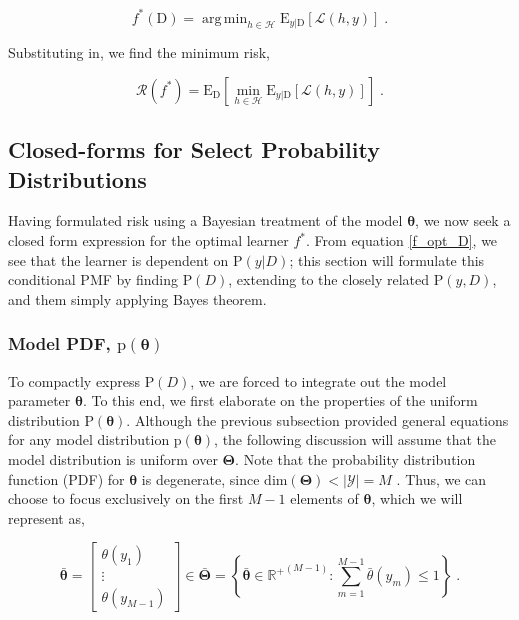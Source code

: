 \documentclass[12pt]{report}
\DeclareMathOperator*{\argmin}{arg\,min}
\begin{document}
\begin{equation} \label{f_opt_D}
f^*(\mathrm{D}) = \argmin_{h \in \mathcal{H}} \text{E}_{y|\mathrm{D}}\left[ \mathcal{L}(h,y) \right] \;.
\end{equation}

Substituting in, we find the minimum risk,

\begin{equation} \label{risk_min}
\mathcal{R}(f^*) = \text{E}_{\mathrm{D}} \left[ \min_{h \in \mathcal{H}} \text{E}_{y|\mathrm{D}}\left[ \mathcal{L}(h,y) \right] \right] \;.
\end{equation}




\subsection{Closed-forms for Select Probability Distributions}

Having formulated risk using a Bayesian treatment of the model $\bm{\theta}$, we now seek a closed form expression for the optimal learner $f^*$. From equation \eqref{f_opt_D}, we see that the learner is dependent on $\text{P}(y|D)$; this section will formulate this conditional PMF by finding $\text{P}(D)$, extending to the closely related $\text{P}(y,D)$, and them simply applying Bayes theorem.


\subsubsection{Model PDF, $\text{p}(\bm{\theta})$}

To compactly express $\text{P}(D)$, we are forced to integrate out the model parameter $\bm{\theta}$. To this end, we first elaborate on the properties of the uniform distribution $\text{P}(\bm{\theta})$. Although the previous subsection provided general equations for any model distribution $\text{p}(\bm{\theta})$, the following discussion will assume that the model distribution is uniform over $\bm{\Theta}$. Note that the probability distribution function (PDF) for $\bm{\theta}$ is degenerate, since $\text{dim}(\bm{\Theta}) < |\mathcal{Y}| = M$ . Thus, we can choose to focus exclusively on the first $M-1$ elements of $\bm{\theta}$, which we will represent as,

\begin{equation}
\bar{\bm{\theta}} = \begin{bmatrix} \theta(y_1) \\ \vdots \\ \theta(y_{M-1}) \end{bmatrix} \in \bar{\bm{\Theta}} = \left\{ \bar{\bm{\theta}} \in {\mathbb{R}^+}^{(M-1)}: \sum_{m=1}^{M-1} \bar{\theta}(y_m) \leq 1 \right\} \;.
\end{equation}
\end{document}
